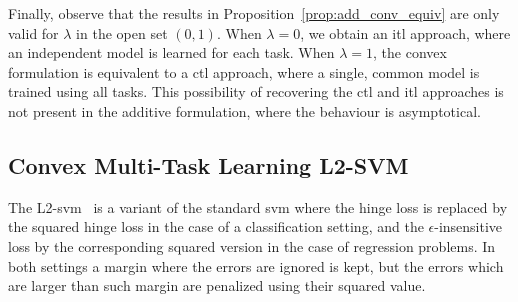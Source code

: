 Finally, observe that the results in Proposition~\ref{prop:add_conv_equiv} are only valid for $\lambda$ in the open set $(0, 1)$. 
When $\lambda=0$, we obtain an \acrshort{itl} approach, where an independent model is learned for each task. When $\lambda=1$, the convex formulation is equivalent to a \acrshort{ctl} approach, where a single, common model is trained using all tasks. This possibility of recovering the \acrshort{ctl} and \acrshort{itl} approaches is not present in the additive formulation, where the behaviour is asymptotical.






\subsection{Convex Multi-Task Learning L2-SVM}
The L2-\acrshort{svm}~\citep{Burges98} is a variant of the standard \acrshort{svm} where the hinge loss is replaced by the squared hinge loss in the case of a classification setting, and the $\epsilon$-insensitive loss by the corresponding squared version in the case of regression problems. In both settings a margin where the errors are ignored is kept, but the errors which are larger than such margin are penalized using their squared value.


